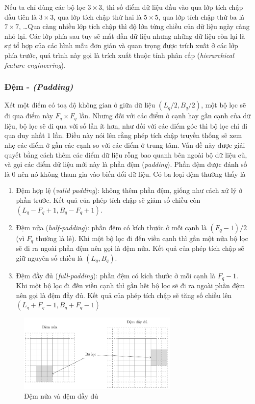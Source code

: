 Nếu ta chỉ dùng các bộ lọc $3\times 3$, thì số điểm dữ liệu đầu vào qua lớp tích chập đầu tiên là $3\times 3$, qua lớp tích chập thứ hai là $5\times 5$, qua lớp tích chập thứ ba là $7\times 7$, \dots Qua càng nhiều lớp tích chập thì độ lớn từng chiều của dữ liệu ngày càng nhỏ lại. Các lớp phía sau tuy sẽ mất dần dữ liệu nhưng những dữ liệu còn lại là sự tổ hợp của các hình mẫu đơn giản và quan trọng được trích xuất ở các lớp phía trước, quá trình này gọi là trích xuất thuộc tính phân cấp (\textit{hierarchical feature engineering}).

\subsubsection{Đệm - \textit{(Padding)}}
Xét một điểm có toạ độ không gian ở giữa dữ liệu $(L_q/2,B_q/2)$, một bộ lọc sẽ đi qua điểm này $F_q\times F_q$ lần. Nhưng đối với các điểm ở cạnh hay gần cạnh của dữ liệu, bộ lọc sẽ đi qua với số lần ít hơn, như đối với các điểm góc thì bộ lọc chỉ đi qua duy nhất $1$ lần. Điều này nói lên rằng phép tích chập truyền thống sẽ xem nhẹ các điểm ở gần các cạnh so với các điểm ở trung tâm. Vấn đề này được giải quyết bằng cách thêm các điểm dữ liệu rỗng bao quanh bên ngoài bộ dữ liệu cũ, và gọi các điểm dữ liệu mới này là phần đệm (\textit{padding}). Phần đệm được đánh số là $0$ nên nó không tham gia vào biến đổi dữ liệu. Có ba loại đệm thường thấy là
\begin{enumerate}
    \item Đệm hợp lệ (\textit{valid padding}): không thêm phần đệm, giống như cách xử lý ở phần trước. Kết quả của phép tích chập sẽ giảm số chiều còn $(L_q-F_q+1,B_q-F_q+1)$.
    \item Đệm nửa (\textit{half-padding}): phần đệm có kích thước ở mỗi cạnh là $(F_q-1)/2$ (vì $F_q$ thường là lẻ). Khi một bộ lọc đi đến viền cạnh thì gần một nửa bộ lọc sẽ đi ra ngoài phần đệm nên gọi là đệm nửa. Kết quả của phép tích chập sẽ giữ nguyên số chiều là $(L_q,B_q)$.
    \item Đệm đầy đủ (\textit{full-padding}): phần đệm có kích thước ở mỗi cạnh là $F_q-1$. Khi một bộ lọc đi đến viền cạnh thì gần hết bộ lọc sẽ đi ra ngoài phần đệm nên gọi là đệm đầy đủ. Kết quả của phép tích chập sẽ tăng số chiều lên $(L_q+F_q-1,B_q+F_q-1)$
\end{enumerate}

\begin{figure}[htb]
    \centering
    \includegraphics[width=0.7\textwidth]{tikz_image/cnn_padding.pdf}
    \caption{Đệm nửa và đệm đầy đủ}
    \label{figure:cnn-padding}
\end{figure}

